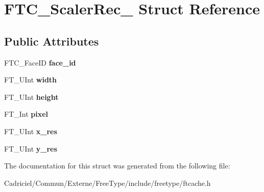 \hypertarget{struct_f_t_c___scaler_rec__}{\section{F\-T\-C\-\_\-\-Scaler\-Rec\-\_\- Struct Reference}
\label{struct_f_t_c___scaler_rec__}
}
\subsection*{Public Attributes}
\begin{DoxyCompactItemize}
\item 
\hypertarget{struct_f_t_c___scaler_rec___a8e963aa619409e646558fe7aa272e81f}{F\-T\-C\-\_\-\-Face\-I\-D {\bfseries face\-\_\-id}}\label{struct_f_t_c___scaler_rec___a8e963aa619409e646558fe7aa272e81f}

\item 
\hypertarget{struct_f_t_c___scaler_rec___a11e13d907ca4661bf7c1d98fffecf321}{F\-T\-\_\-\-U\-Int {\bfseries width}}\label{struct_f_t_c___scaler_rec___a11e13d907ca4661bf7c1d98fffecf321}

\item 
\hypertarget{struct_f_t_c___scaler_rec___a9b3a9b4d7148bbaa4daaae1e1fbb2dbc}{F\-T\-\_\-\-U\-Int {\bfseries height}}\label{struct_f_t_c___scaler_rec___a9b3a9b4d7148bbaa4daaae1e1fbb2dbc}

\item 
\hypertarget{struct_f_t_c___scaler_rec___ab78868341e2d66f17e6f1d77e9e054d2}{F\-T\-\_\-\-Int {\bfseries pixel}}\label{struct_f_t_c___scaler_rec___ab78868341e2d66f17e6f1d77e9e054d2}

\item 
\hypertarget{struct_f_t_c___scaler_rec___a886c7c1230dc5d5e6b3fc32d06274752}{F\-T\-\_\-\-U\-Int {\bfseries x\-\_\-res}}\label{struct_f_t_c___scaler_rec___a886c7c1230dc5d5e6b3fc32d06274752}

\item 
\hypertarget{struct_f_t_c___scaler_rec___accb53c7a9aeebb41c05f48d14d3dfe71}{F\-T\-\_\-\-U\-Int {\bfseries y\-\_\-res}}\label{struct_f_t_c___scaler_rec___accb53c7a9aeebb41c05f48d14d3dfe71}

\end{DoxyCompactItemize}


The documentation for this struct was generated from the following file\-:\begin{DoxyCompactItemize}
\item 
Cadriciel/\-Commun/\-Externe/\-Free\-Type/include/freetype/ftcache.\-h\end{DoxyCompactItemize}
